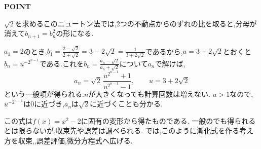 \begin{bookpoint}
  \textbf{POINT}\par
  $\sqrt2$を求めるこのニュートン法では,2つの不動点からのずれの比を取ると,分母が消えて$b_{n+1}=b_n^2$の形になる.
\end{bookpoint}

$a_1=2$のとき,$b_1=\frac{2-\sqrt2}{2+\sqrt2}=3-2\sqrt2=\frac1{3+2\sqrt2}$であるから,$u=3+2\sqrt2$とおくと$b_n=u^{-2^{n-1}}$である.これを$b_n=\frac{a_n-\sqrt2}{a_n+\sqrt2}$について$a_n$で解けば,
\[
  a_n=\sqrt{2}\,\frac{u^{2^{n-1}}+1}{u^{2^{n-1}}-1},\qquad u=3+2\sqrt2
\]
という一般項が得られる.$n$が大きくなっても計算回数は増えない.
$u>1$なので,$u^{-2^{n-1}}$は$0$に近づき,$a_n$は$\sqrt2$に近づくことも分かる.

この式は$f(x)=x^2-2$に固有の変形から得たものである.
一般のでも得られるとは限らないが,収束先や誤差は調べられる.
では,このように漸化式を作る考え方を収束,,誤差評価,微分方程式へ広げる.
